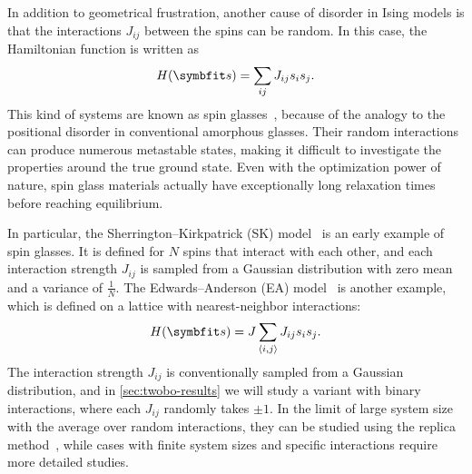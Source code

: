 In addition to geometrical frustration, another cause of disorder in Ising models is that the interactions $J_{i j}$ between the spins can be random. In this case, the Hamiltonian function is written as
\begin{equation}
H(\vs) = \sum_{i j} J_{i j} s_i s_j.
\label{eq:cl-ising-general}
\end{equation}
This kind of systems are known as spin glasses~\cite{fischer1993spin, nishimori2001statistical}, because of the analogy to the positional disorder in conventional amorphous glasses. Their random interactions can produce numerous metastable states, making it difficult to investigate the properties around the true ground state. Even with the optimization power of nature, spin glass materials actually have exceptionally long relaxation times before reaching equilibrium.

In particular, the Sherrington--Kirkpatrick (SK) model~\cite{sherrington1975solvable} is an early example of spin glasses. It is defined for $N$ spins that interact with each other, and each interaction strength $J_{i j}$ is sampled from a Gaussian distribution with zero mean and a variance of $\frac{1}{N}$. The Edwards--Anderson (EA) model~\cite{edwards1975theory} is another example, which is defined on a lattice with nearest-neighbor interactions:
\begin{equation}
H(\vs) = J \sum_{\langle i, j \rangle} J_{i j} s_i s_j.
\end{equation}
The interaction strength $J_{i j}$ is conventionally sampled from a Gaussian distribution, and in \cref{sec:twobo-results} we will study a variant with binary interactions, where each $J_{i j}$ randomly takes $\pm 1$. In the limit of large system size with the average over random interactions, they can be studied using the replica method~\cite{parisi1979infinite}, while cases with finite system sizes and specific interactions require more detailed studies.

